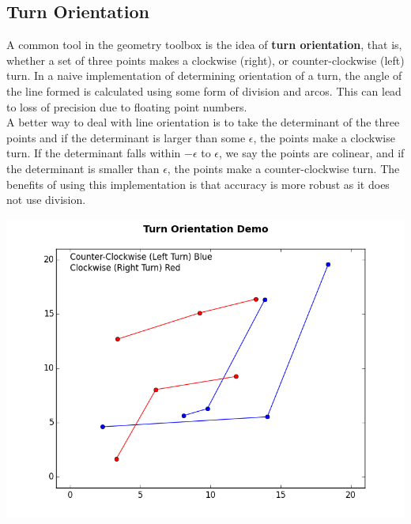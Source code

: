 \documentclass[10pt]{article}
\begin{document}
\begin{multicols}{2}
\subsection{Turn Orientation}

\indent A common tool in the geometry toolbox is the idea of \textbf{turn orientation}, that is, whether a set of three points makes a clockwise (right), or counter-clockwise (left) turn. In a naive implementation of determining orientation of a turn, the angle of the line formed is calculated using some form of division and arcos. This can lead to loss of precision due to floating point numbers. \newline \\
\indent A better way to deal with line orientation is to take the determinant of the three points and if the determinant is larger than some $\epsilon$, the points make a clockwise turn. If the determinant falls within $-\epsilon$ to $\epsilon$, we say the points are colinear, and if the determinant is smaller than $\epsilon$, the points make a counter-clockwise turn. The benefits of using this implementation is that accuracy is more robust as it does not use division. \newline \\
\centerline{\includegraphics[scale=.4]{turn_orientation.png}}


\end{multicols}
\end{document}

